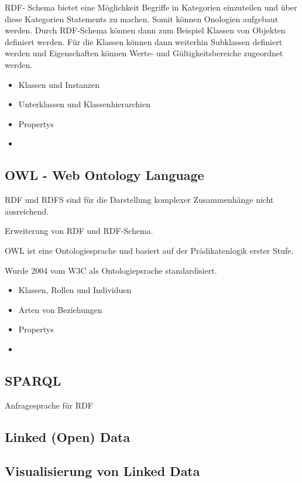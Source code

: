 RDF- Schema bietet eine Möglichkeit Begriffe in Kategorien einzuteilen und über diese Kategorien Statements zu machen.
Somit können Onologien aufgebaut werden.
Durch RDF-Schema können dann zum Beispiel Klassen von Objekten definiert werden.
Für die Klassen können dann weiterhin Subklassen definiert werden und Eigenschaften können Werte- und Gültigkeitsbereiche zugeordnet werden. \citep[vgl.]{pellegrinix}

\begin{itemize}
	\item Klassen und Instanzen
	\item Unterklassen und Klassenhierarchien
	\item Propertys
	\item 
\end{itemize}

\subsection{OWL - Web Ontology Language}

RDF und RDFS sind für die Darstellung komplexer Zusammenhänge nicht ausreichend.

Erweiterung von RDF und RDF-Schema. 

OWL ist eine Ontologiesprache und basiert auf der Prädikatenlogik erster Stufe.

Wurde 2004 vom W3C als Ontologiepsrache standardisiert.

\begin{itemize}
	\item Klassen, Rollen und Individuen
	\item Arten von Beziehungen
	\item Propertys
	\item 
\end{itemize}

\subsection{SPARQL} 

Anfragesprache für RDF

\subsection{Linked (Open) Data}

\subsection{Visualisierung von Linked Data} 

